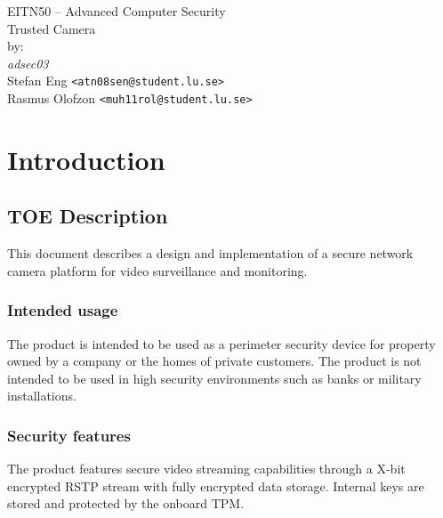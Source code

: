 \documentclass[10pt]{article}
\begin{document}

  \thispagestyle{empty}
  \vspace*{3cm}
  \begin{center}
    \huge{EITN50 -- Advanced Computer Security} \\
    \vspace{0.3cm}
    \LARGE{Trusted Camera} \\
    \vspace{1cm}
    \large{by: \\ \vspace{0.2cm}
	\textit{adsec03} \\
        Stefan Eng \texttt{<atn08sen@student.lu.se>} \\
        Rasmus Olofzon \texttt{<muh11rol@student.lu.se>}
        } \\
  \end{center}


  \newpage

  \section{Introduction}

    \subsection{TOE Description}

      This document describes a design and implementation of a secure network
      camera platform for video surveillance and monitoring.

      \subsubsection{Intended usage}

        The product is intended to be used as a perimeter security device for
        property owned by a company or the homes of private customers. The
        product is not intended to be used in high security environments such
        as banks or military installations.

      \subsubsection{Security features}

        The product features secure video streaming capabilities through a
        X-bit encrypted RSTP stream with fully encrypted data storage. Internal
        keys are stored and protected by the onboard TPM.
\end{document}
